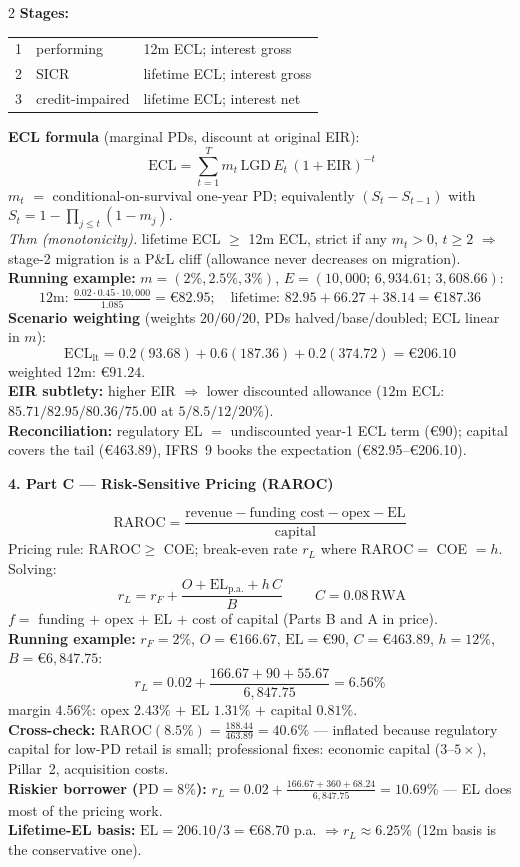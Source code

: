 \documentclass[10pt,a4paper]{report}
\renewcommand{\EUR}[1]{\euro#1}
\newcommand{\PD}{\mathrm{PD}}
\newcommand{\LGD}{\mathrm{LGD}}
\newcommand{\RWA}{\mathrm{RWA}}
\newcommand{\EL}{\mathrm{EL}}
\newcommand{\EIR}{\mathrm{EIR}}
\newcommand{\ECL}{\mathrm{ECL}}
\newcommand{\raroc}{\mathrm{RAROC}}
\newcommand{\sect}[1]{\vspace{1.2mm}\textcolor{ceruleanlink}{\textbf{#1}}\par\vspace{0.3mm}}
\newcommand{\mini}[1]{\textbf{\small #1}}
\begin{document}
\begin{multicols}{2}
\mini{Stages:}
\begin{center}\small
\begin{tabular}{@{}lll@{}}
\toprule
1 & performing & 12m ECL; interest gross\\
2 & SICR & lifetime ECL; interest gross\\
3 & credit-impaired & lifetime ECL; interest net\\
\bottomrule
\end{tabular}
\end{center}
\mini{ECL formula} (marginal PDs, discount at original EIR):
\[
\boxed{\;\ECL=\sum_{t=1}^{T} m_t\,\LGD\,E_t\,(1+\EIR)^{-t}}
\]
$m_t$ $=$ conditional-on-survival one-year PD; equivalently
$(S_t-S_{t-1})$ with $S_t=1-\prod_{j\le t}(1-m_j)$.\\
\emph{Thm (monotonicity).} lifetime ECL $\ge$ 12m ECL, strict if any
$m_t>0$, $t\ge2$ $\Rightarrow$ stage-2 migration is a P\&L cliff
(allowance never decreases on migration).\\
\mini{Running example:} $m=(2\%,2.5\%,3\%)$, $E=(10{,}000;\,
6{,}934.61;\,3{,}608.66)$:
\[
\text{12m: } \tfrac{0.02\cdot0.45\cdot10{,}000}{1.085}
=\EUR{82.95};\quad
\text{lifetime: } 82.95+66.27+38.14=\EUR{187.36}
\]
\mini{Scenario weighting} (weights $20/60/20$, PDs halved/base/doubled;
ECL linear in $m$):
\[
\ECL_{\mathrm{lt}}=0.2(93.68)+0.6(187.36)+0.2(374.72)
=\EUR{206.10}
\]
weighted 12m: $\EUR{91.24}$.\\
\mini{EIR subtlety:} higher EIR $\Rightarrow$ lower discounted
allowance ($12$m ECL: $85.71/82.95/80.36/75.00$ at
$5/8.5/12/20\%$).\\
\mini{Reconciliation:} regulatory EL $=$ undiscounted year-1 ECL term
($\EUR{90}$); capital covers the tail (\EUR{463.89}), IFRS~9 books
the expectation (\EUR{82.95}--\EUR{206.10}).

\sect{4. Part C --- Risk-Sensitive Pricing (RAROC)}

\[
\raroc=\frac{\text{revenue}-\text{funding cost}-\text{opex}-\EL}
{\text{capital}}
\]
Pricing rule: $\raroc\ge$ COE; break-even rate $r_L$ where
$\raroc=$ COE $=h$. Solving:
\[
\boxed{\;r_L=r_F+\frac{O+\EL_{\text{p.a.}}+h\,C}{B}\;}
\qquad C=0.08\,\RWA
\]
$f=$ funding $+$ opex $+$ EL $+$ cost of capital (Parts B and A in
price).\\
\mini{Running example:} $r_F=2\%$, $O=\EUR{166.67}$,
$\EL=\EUR{90}$, $C=\EUR{463.89}$, $h=12\%$,
$B=\EUR{6{,}847.75}$:
\[
r_L=0.02+\frac{166.67+90+55.67}{6{,}847.75}=6.56\%
\]
margin $4.56\%$: opex $2.43\%$ $+$ EL $1.31\%$ $+$ capital $0.81\%$.\\
\mini{Cross-check:}
$\raroc(8.5\%)=\frac{188.44}{463.89}=40.6\%$ ---
inflated because regulatory capital for low-PD retail is small;
professional fixes: economic capital ($3$--$5\times$), Pillar~2,
acquisition costs.\\
\mini{Riskier borrower ($\PD=8\%$):}
$r_L=0.02+\frac{166.67+360+68.24}{6{,}847.75}=10.69\%$ ---
EL does most of the pricing work.\\
\mini{Lifetime-EL basis:} $\EL=206.10/3=\EUR{68.70}$ p.a.
$\Rightarrow r_L\approx6.25\%$ (12m basis is the conservative one).


\end{multicols}
\end{document}

